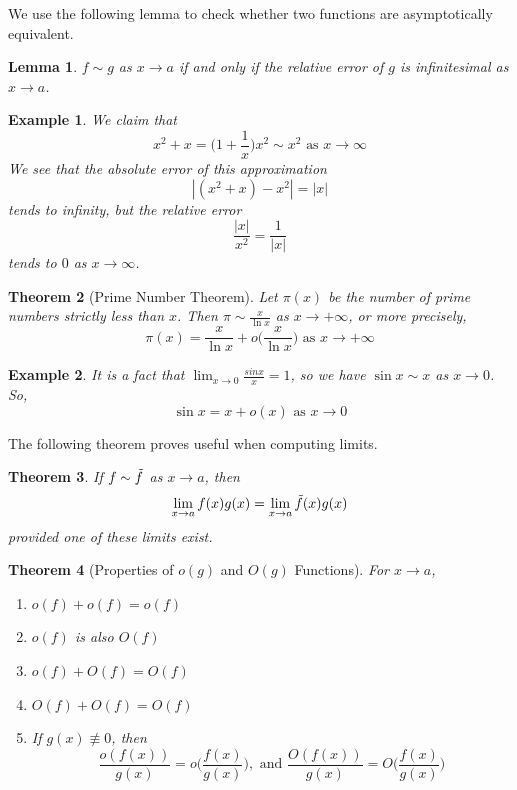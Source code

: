 \documentclass{article}
\newtheorem{theorem}{Theorem}[section]
\newtheorem{lemma}[theorem]{Lemma}
\newtheorem{example}{Example}[section]
\theoremstyle{remark}
\theoremstyle{definition}
\begin{document}
We use the following lemma to check whether two functions are asymptotically equivalent. 
\begin{lemma}
$f \sim g$ as $x \rightarrow a$ if and only if the relative error of $g$ is infinitesimal as $x \rightarrow a$. 
\end{lemma}

\begin{example}
We claim that 
\[x^2 + x = \bigg(1 + \frac{1}{x} \bigg) x^2 \sim x^2 \text{ as } x \rightarrow \infty\]
We see that the absolute error of this approximation 
\[|(x^2 + x) - x^2| = |x|\]
tends to infinity, but the relative error
\[\frac{|x|}{x^2} = \frac{1}{|x|}\]
tends to $0$ as $x \rightarrow \infty$. 
\end{example}

\begin{theorem}[Prime Number Theorem]
Let $\pi(x)$ be the number of prime numbers strictly less than $x$. Then $\pi \sim \frac{x}{\ln{x}}$ as $x\rightarrow + \infty$, or more precisely, 
\[\pi(x) = \frac{x}{\ln{x}} + o \bigg( \frac{x}{\ln{x}}\bigg) \text{ as } x \rightarrow +\infty\]
\end{theorem}

\begin{example}
It is a fact that $\lim_{x\rightarrow 0} \frac{sin{x}}{x} = 1$, so we have $\sin{x} \sim x$ as $x \rightarrow 0$. So,
\[\sin{x} = x + o(x) \text{ as } x \rightarrow 0\]
\end{example}

The following theorem proves useful when computing limits. 
\begin{theorem}
If $f \sim \Tilde{f}$ as $x \rightarrow a$, then 
\[\lim_{x \rightarrow a} f(x) g(x) = \lim_{x \rightarrow a} \Tilde{f}(x) g(x)\]
provided one of these limits exist. 
\end{theorem}

\begin{theorem}[Properties of $o(g)$ and $O(g)$ Functions]
For $x \rightarrow a$, 
\begin{enumerate}
    \item $o(f) + o(f) = o(f)$
    \item $o(f)$ is also $O(f)$
    \item $o(f) + O(f) = O(f)$
    \item $O(f) + O(f) = O(f)$
    \item If $g(x) \not\equiv 0$, then 
    \[\frac{o(f(x))}{g(x)} = o \bigg( \frac{f(x)}{g(x)} \bigg), \text{ and } \frac{O(f(x))}{g(x)} = O \bigg( \frac{f(x)}{g(x)} \bigg)\]
\end{enumerate}
\end{theorem}
\end{document}
